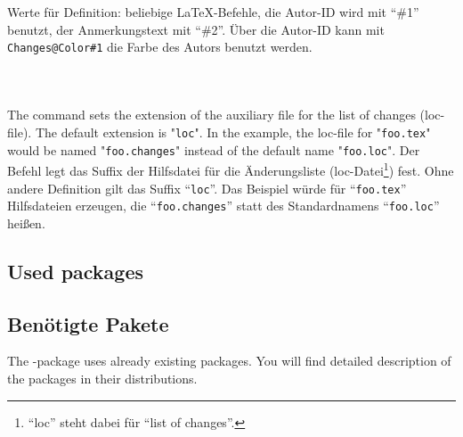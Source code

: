 		Werte für Definition: beliebige \LaTeX-Befehle, die Autor-ID wird mit "`\#1"' benutzt, der Anmerkungstext mit "`\#2"'.
		Über die Autor-ID kann mit \texttt{Changes@Color\#1} die Farbe des Autors benutzt werden.
	\fi
\begin{einspiel}
	\>
\end{einspiel}
\begin{einspiel}[true]
	\>\\
	\>
\end{einspiel}

\subsubsection{}
\DescribeMacro{\setlocextension}
\ifENGLISH
	The command  sets the extension of the auxiliary file for the list of changes (loc-file).
	The default extension is "\texttt{loc}".
	In the example, the loc-file for "\texttt{foo.tex}" would be named "\texttt{foo.changes}" instead of the default name "\texttt{foo.loc}".
\fi
	\ifGERMAN
		Der Befehl  legt das Suffix der Hilfsdatei für die Änderungsliste (loc-Datei\footnote{%
			"`loc"' steht dabei für "`list of changes"'.
		}) fest.
		Ohne andere Definition gilt das Suffix "`\texttt{loc}"'.
		Das Beispiel würde für "`\texttt{foo.tex}"' Hilfsdateien erzeugen, die "`\texttt{foo.changes}"' statt des Standardnamens "`\texttt{foo.loc}"' heißen.
	\fi
\begin{einspiel}
	\>
\end{einspiel}
\begin{einspiel}[true]
	\>
\end{einspiel}

\ifENGLISH
	\subsection{Used packages}
\fi
	\ifGERMAN
		\subsection{Benötigte Pakete}
	\fi
\label{sec:user:packages}

\ifENGLISH
	The -package uses already existing packages.
	You will find detailed description of the packages in their distributions.


